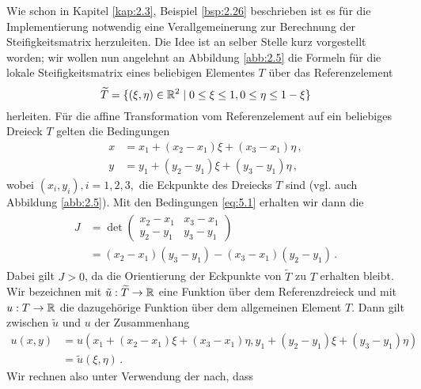 Wie schon in Kapitel \ref{kap:2.3}, Beispiel \ref{bsp:2.26} beschrieben ist es für die Implementierung notwendig eine Verallgemeinerung zur Berechnung der Steifigkeitsmatrix herzuleiten. Die Idee ist an selber Stelle kurz vorgestellt worden; wir wollen nun angelehnt an Abbildung \ref{abb:2.5} die Formeln für die lokale Steifigkeitsmatrix eines beliebigen Elementes $T$ über das Referenzelement
\[
	\widetilde T = \{(\xi ,\eta)\in \mathbb{R}^2\mid 0\le \xi \le 1, 0\le \eta \le 1-\xi\}
\]
herleiten. Für die affine Transformation vom Referenzelement auf ein beliebiges Dreieck $T$ gelten die Bedingungen
\begin{subequations}\label{eq:5.1}
\begin{align}\label{eq:5.1a}
	x & = x_1 + (x_2-x_1)\xi + (x_3-x_1) \eta \, ,\\
	\label{eq:5.1b}
	y & = y_1 + (y_2-y_1)\xi + (y_3-y_1)\eta \, ,
\end{align}
\end{subequations}
wobei $(x_i,y_i),i=1,2,3,$ die Eckpunkte des Dreiecks $T$ sind (vgl. auch Abbildung \ref{abb:2.5}). Mit den Bedingungen \eqref{eq:5.1} erhalten wir dann die 
\begin{align}\label{eq:5.2}
\begin{aligned}
	J & = \det \begin{pmatrix}
				x_2-x_1 & x_3-x_1 \\
				y_2-y_1 & y_3-y_1
			\end{pmatrix}  \\
			& = (x_2-x_1)(y_3-y_1) - (x_3-x_1)(y_2-y_1)\, .
\end{aligned}
\end{align}
Dabei gilt $J>0$, da die Orientierung der Eckpunkte von $\widetilde T$ zu $T$ erhalten bleibt. Wir bezeichnen mit $\tilde u : \widetilde T \rightarrow \mathbb{R}$ eine Funktion über dem Referenzdreieck und mit $u:T\rightarrow \mathbb{R}$ die dazugehörige Funktion über dem allgemeinen Element $T$. Dann gilt zwischen $\tilde u $ und $u$ der Zusammenhang
\begin{align*}
	u(x,y) & = u(x_1 + (x_2-x_1)\xi + (x_3-x_1) \eta, y_1 + (y_2-y_1)\xi + (y_3-y_1)\eta) \\
	& =\tilde u(\xi,\eta) \, .
\end{align*}
Wir rechnen also unter Verwendung der  nach, dass
